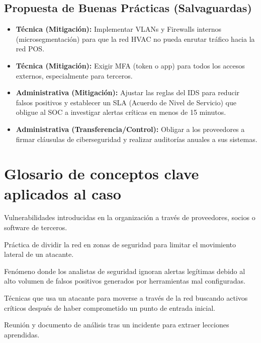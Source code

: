 \documentclass[11pt,a4paper]{article}
\begin{document}
\subsection{Propuesta de Buenas Prácticas (Salvaguardas)}
\begin{itemize}[leftmargin=*]
  \item \textbf{Técnica (Mitigación):} Implementar VLANs y Firewalls internos (microsegmentación) para que la red HVAC no pueda enrutar tráfico hacia la red POS.
  \item \textbf{Técnica (Mitigación):} Exigir MFA (token o app) para todos los accesos externos, especialmente para terceros.
  \item \textbf{Administrativa (Mitigación):} Ajustar las reglas del IDS para reducir falsos positivos y establecer un SLA (Acuerdo de Nivel de Servicio) que obligue al SOC a investigar alertas críticas en menos de 15 minutos.
  \item \textbf{Administrativa (Transferencia/Control):} Obligar a los proveedores a firmar cláusulas de ciberseguridad y realizar auditorías anuales a sus sistemas.
\end{itemize}

\section{Glosario de conceptos clave aplicados al caso}
\begin{description}[leftmargin=!, labelwidth=3.5cm, font=\bfseries]
  \item[Riesgo de Terceros (Supply Chain)] Vulnerabilidades introducidas en la organización a través de proveedores, socios o software de terceros.
  \item[Segmentación de Red] Práctica de dividir la red en zonas de seguridad para limitar el movimiento lateral de un atacante.
  \item[Fatiga de Alertas] Fenómeno donde los analistas de seguridad ignoran alertas legítimas debido al alto volumen de falsos positivos generados por herramientas mal configuradas.
  \item[Movimiento Lateral] Técnicas que usa un atacante para moverse a través de la red buscando activos críticos después de haber comprometido un punto de entrada inicial.
  \item[Post-Mortem] Reunión y documento de análisis tras un incidente para extraer lecciones aprendidas.
\end{description}
\end{document}
